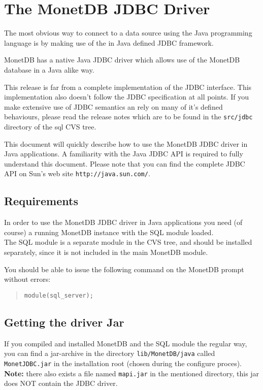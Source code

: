 \documentclass{article}
\begin{document}
\section{The MonetDB JDBC Driver}
The most obvious way to connect to a data source using the Java programming language
is by making use of the in Java defined JDBC framework.

MonetDB has a native Java JDBC driver which allows use of the MonetDB database in
a Java alike way.

This release is far from a complete implementation of the JDBC interface. This
implementation also doesn't follow the JDBC specification at all points. If you make
extensive use of JDBC semantics an rely on many of it's defined behaviours, please
read the release notes which are to be found in the \texttt{src/jdbc} directory of the sql
CVS tree.

This document will quickly describe how to use the MonetDB JDBC driver in
Java applications. A familiarity with the Java JDBC API is required to fully understand
this document. Please note that you can find the complete JDBC API on Sun's web site
\texttt{http://java.sun.com/}.

\subsection{Requirements}
In order to use the MonetDB JDBC driver in Java applications you need (of course) a running MonetDB instance with the SQL module loaded.\\
The SQL module is a separate module in the CVS tree, and should be installed separately, since
it is not included in the main MonetDB module.

You should be able to issue the following command on the MonetDB prompt without errors:
\begin{quote}
\texttt{module(sql\_server);}
\end{quote}

\subsection{Getting the driver Jar}
If you compiled and installed MonetDB and the SQL module the regular way, you can find a
jar-archive in the directory \texttt{lib/MonetDB/java} called \texttt{MonetJDBC.jar} in the
installation root (chosen during the configure proces).\\
\textbf{Note:} there also exists a file named \texttt{mapi.jar} in the mentioned directory, this
jar does NOT contain the JDBC driver.
\end{document}
